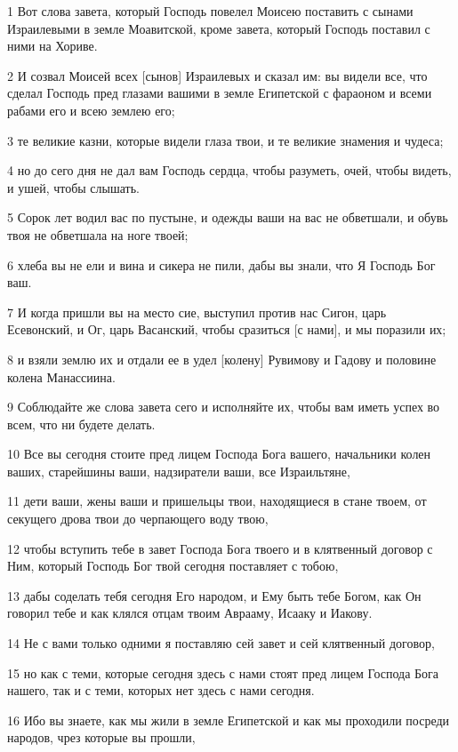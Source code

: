 \par 1 Вот слова завета, который Господь повелел Моисею поставить с сынами Израилевыми в земле Моавитской, кроме завета, который Господь поставил с ними на Хориве.
\par 2 И созвал Моисей всех [сынов] Израилевых и сказал им: вы видели все, что сделал Господь пред глазами вашими в земле Египетской с фараоном и всеми рабами его и всею землею его;
\par 3 те великие казни, которые видели глаза твои, и те великие знамения и чудеса;
\par 4 но до сего дня не дал вам Господь сердца, чтобы разуметь, очей, чтобы видеть, и ушей, чтобы слышать.
\par 5 Сорок лет водил вас по пустыне, и одежды ваши на вас не обветшали, и обувь твоя не обветшала на ноге твоей;
\par 6 хлеба вы не ели и вина и сикера не пили, дабы вы знали, что Я Господь Бог ваш.
\par 7 И когда пришли вы на место сие, выступил против нас Сигон, царь Есевонский, и Ог, царь Васанский, чтобы сразиться [с нами], и мы поразили их;
\par 8 и взяли землю их и отдали ее в удел [колену] Рувимову и Гадову и половине колена Манассиина.
\par 9 Соблюдайте же слова завета сего и исполняйте их, чтобы вам иметь успех во всем, что ни будете делать.
\par 10 Все вы сегодня стоите пред лицем Господа Бога вашего, начальники колен ваших, старейшины ваши, надзиратели ваши, все Израильтяне,
\par 11 дети ваши, жены ваши и пришельцы твои, находящиеся в стане твоем, от секущего дрова твои до черпающего воду твою,
\par 12 чтобы вступить тебе в завет Господа Бога твоего и в клятвенный договор с Ним, который Господь Бог твой сегодня поставляет с тобою,
\par 13 дабы соделать тебя сегодня Его народом, и Ему быть тебе Богом, как Он говорил тебе и как клялся отцам твоим Аврааму, Исааку и Иакову.
\par 14 Не с вами только одними я поставляю сей завет и сей клятвенный договор,
\par 15 но как с теми, которые сегодня здесь с нами стоят пред лицем Господа Бога нашего, так и с теми, которых нет здесь с нами сегодня.
\par 16 Ибо вы знаете, как мы жили в земле Египетской и как мы проходили посреди народов, чрез которые вы прошли,
